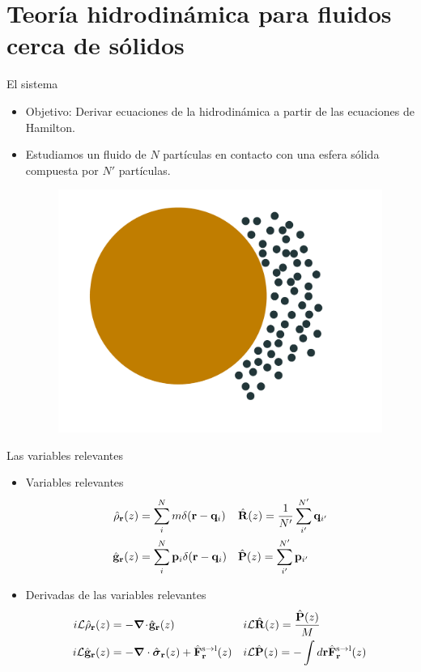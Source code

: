 \documentclass{beamer}
\newcommand{\esc}{\!\cdot\!}
\begin{document}
\section{Teoría hidrodinámica para fluidos cerca de sólidos}
\begin{frame}{El sistema}
  \begin{itemize}
    \item<1-> \alert{Objetivo}: Derivar ecuaciones de la hidrodinámica a partir de las ecuaciones de Hamilton. 
    \item<2-> Estudiamos un fluido de $N$ partículas en contacto con una esfera sólida compuesta por $N'$ partículas.
  \begin{figure}
  \includegraphics[width=.6\linewidth]{esfera}
  \end{figure}
  \end{itemize}
\end{frame}
   
   \begin{frame}{Las variables relevantes}
     \begin{itemize}
    \item<1-> Variables relevantes
      \begin{align}
        \hat{\rho}_{\bf r}(z) &=\sum^{N}_im\delta({\bf r}-{\bf q}_i)
      &&\hat{\bf R}(z)=\frac{1}{N'}\sum_{i'}^{N'}{\bf q}_{i'}
      \nonumber\\
        \hat{\bf g}_{\bf r}(z) &=\sum^{N}_i{\bf p}_i\delta({\bf r}-{\bf q}_i)
      &&\hat{\bf P}(z)=\sum_{i'}^{N'}{\bf p}_{i'}
      \nonumber
      \end{align}
    \item<2-> Derivadas de las variables relevantes
      \begin{align}
        i{\cal L} \hat{\rho}_{\bf r}(z) &= -\boldsymbol{\nabla}\esc\hat{\bf g}_{\bf r}(z)
        && i{\cal L}\hat{\bf R}(z) =\frac{\hat{\bf P}(z)}{M}
      \nonumber\\
      i{\cal L}\hat{\bf g}_{\bf r}(z)
          &=-\boldsymbol{\nabla}\cdot \hat{\boldsymbol{\sigma}}_{\bf r}(z)+\hat{{\bf F}}^{\rm s\to l}_{\bf r}(z) 
        &&i{\cal L}\hat{\bf P}(z) =-\int  d{\bf r} \hat{\bf F}^{\rm s\to l}_{\bf r}(z)
         \nonumber
\end{align}
    \end{itemize}
\end{frame}
\end{document}
